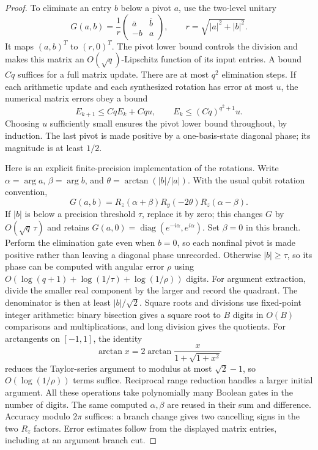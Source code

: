 \documentclass[11pt]{article}
\begin{document}
\begin{proof}
To eliminate an entry $b$ below a pivot $a$, use the two-level unitary
\[
 G(a,b)=\frac1r
   \begin{pmatrix}\overline a&\overline b\\-b&a\end{pmatrix},
 \qquad r=\sqrt{|a|^2+|b|^2}.
\]
It maps $(a,b)^T$ to $(r,0)^T$. The pivot lower bound controls the
division and makes this matrix an $O(\sqrt q)$-Lipschitz function
of its input entries. A bound $Cq$ suffices for a full matrix update.
There are at most $q^2$ elimination steps. If each arithmetic update
and each synthesized rotation has error at most $u$, the numerical
matrix errors obey a bound
\[
 E_{k+1}\leq Cq E_k+Cq u,
 \qquad E_k\leq (Cq)^{q^2+1}u.
\]
Choosing $u$ sufficiently small ensures the pivot lower bound
throughout, by induction. The last pivot is made positive by a
one-basis-state diagonal phase; its magnitude is at least $1/2$.

Here is an explicit finite-precision implementation of the rotations.
Write $\alpha=\arg a$, $\beta=\arg b$, and
$\theta=\arctan(|b|/|a|)$. With the usual qubit rotation convention,
\[
 G(a,b)=R_z(\alpha+\beta)R_y(-2\theta)R_z(\alpha-\beta).
\]
If $|b|$ is below a precision threshold $\tau$, replace it by zero;
this changes $G$ by $O(\sqrt q\,\tau)$ and retains
$G(a,0)=\operatorname{diag}(e^{-i\alpha},e^{i\alpha})$.
Set $\beta=0$ in this branch. Perform the elimination gate even
when $b=0$, so each nonfinal pivot is made positive rather than
leaving a diagonal phase unrecorded.
Otherwise $|b|\geq\tau$, so its phase can be computed with angular
error $\rho$ using
$O(\log(q+1)+\log(1/\tau)+\log(1/\rho))$ digits.
For argument extraction, divide the smaller real component by the
larger and record the quadrant. The denominator is then at least
$|b|/\sqrt2$. Square roots and divisions use fixed-point integer
arithmetic: binary bisection gives a square root to $B$ digits in
$O(B)$ comparisons and multiplications, and long division gives the
quotients. For arctangents on $[-1,1]$, the identity
\[
 \arctan x=2\arctan\frac{x}{1+\sqrt{1+x^2}}
\]
reduces the Taylor-series argument to modulus at most
$\sqrt2-1$, so $O(\log(1/\rho))$ terms suffice. Reciprocal range
reduction handles a larger initial argument. All these operations
take polynomially many Boolean gates in the number of digits.
The same computed $\alpha,\beta$ are reused in their sum and
difference. Accuracy modulo $2\pi$ suffices: a branch change gives
two cancelling signs in the two $R_z$ factors. Error estimates follow
from the displayed matrix entries, including at an argument branch cut.


\end{proof}
\end{document}

